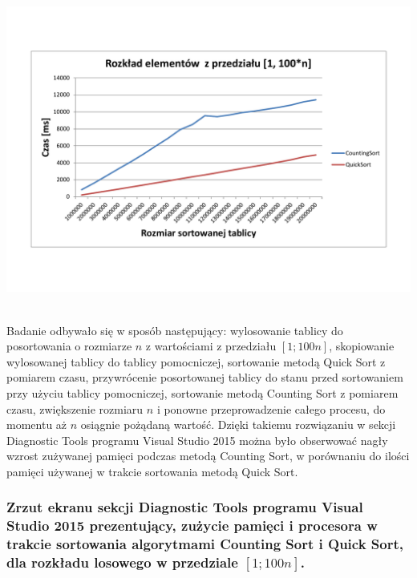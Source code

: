\documentclass[polish,polish,a4paper]{article}
\begin{document}
\begin{spacing}{1.5}
\begin{minipage}[H]{\textwidth}
	\begin{center}
		\includegraphics[scale=0.6]{zad4100n.pdf}
		\label{fig:zad4100n}
	\end{center}
\end{minipage}\\

Badanie odbywało się w sposób następujący: wylosowanie tablicy do posortowania o rozmiarze $n$ z wartościami z przedziału $[1;100n]$, skopiowanie wylosowanej tablicy do tablicy pomocniczej, sortowanie metodą Quick Sort z pomiarem czasu, przywrócenie posortowanej tablicy do stanu przed sortowaniem przy użyciu tablicy pomocniczej, sortowanie metodą Counting Sort z pomiarem czasu, zwiększenie rozmiaru $n$ i ponowne przeprowadzenie całego procesu, do momentu aż $n$ osiągnie pożądaną wartość.	Dzięki takiemu rozwiązaniu w sekcji Diagnostic Tools programu Visual Studio 2015 można było obserwować nagły wzrost zużywanej pamięci podczas metodą Counting Sort, w porównaniu do ilości pamięci używanej w trakcie sortowania metodą Quick Sort. 

\subsubsection*{Zrzut ekranu sekcji Diagnostic Tools programu Visual Studio 2015 prezentujący, zużycie pamięci i procesora w trakcie sortowania algorytmami Counting Sort i  Quick Sort, dla rozkładu losowego w przedziale $[1;100n]$.}


\end{spacing}
\end{document}
